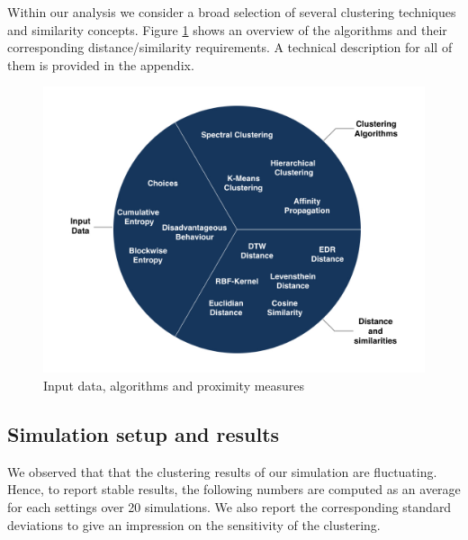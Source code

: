 \documentclass[12pt,a4paper,bibliography=totocnumbered,listof=totocnumbered]{scrartcl}
\begin{document}
Within our analysis we consider a broad selection of several clustering techniques and similarity concepts. Figure \ref{fig:cla} shows an overview of the algorithms and their corresponding distance/similarity requirements. A technical description for all of them is provided in the appendix. 

\begin{figure}[H]
	\includegraphics[width=\textwidth]{Pictures/DataClustering.jpeg}
	\caption{Input data, algorithms and proximity measures}
	\label{fig:cla}
\end{figure}

\subsection{Simulation setup and results}

We observed that that the clustering results of our simulation are fluctuating. Hence, to report stable results, the following numbers are computed as an average for each settings over 20 simulations. We also report the corresponding standard deviations to give an impression on the sensitivity of the clustering.\\
\end{document}
